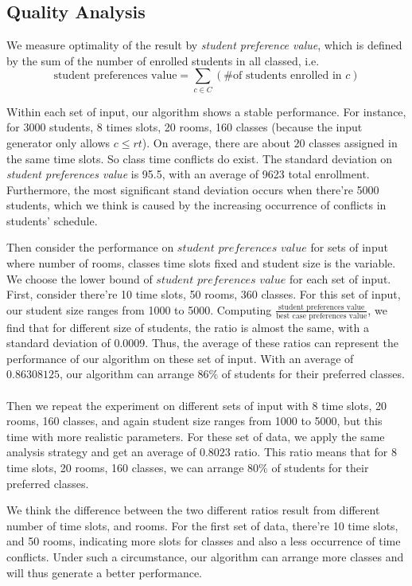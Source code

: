 \documentclass[11pt, oneside]{article}   	%
\begin{document}
 \subsection{Quality Analysis}
\par We measure optimality of the result by \textit{student preference  value}, which is defined by the sum of the number of enrolled students in all classed, i.e. 
\[\text{student preferences value} = \sum_{c\in C} (\text{\# of students enrolled in }c)\]
\par Within each set of input, our algorithm shows a stable performance. For instance, for 3000 students, 8 times slots, 20 rooms, 160 classes (because the input generator only allows $c\leq rt$). On average, there are about $20$ classes assigned in the same time slots. So class time conflicts do exist. The standard deviation on \textit{student preferences value} is 95.5, with an average of 9623 total enrollment. Furthermore, the most significant stand deviation occurs when there're 5000 students, which we think is caused by the increasing occurrence of conflicts in students' schedule. 
\par Then consider the performance on $student$ $preferences$ $value$ for sets of input where number of rooms, classes time slots fixed and student size is the variable. We choose the lower bound of $student$ $preferences$ $value$ for each set of input. First, consider there're 10 time slots, 50 rooms, 360 classes. For this set of input, our student size ranges from 1000 to 5000. Computing $\frac{\text{student preferences value}}{\text{best case preferences value}}$, we find that for different size of students, the ratio is almost the same, with a standard deviation of 0.0009. Thus, the average of these ratios can represent the performance of our algorithm on these set of input. With an average of $0.86308125$, our algorithm can arrange $86\%$ of students for their preferred classes.\\ \\Then we repeat the experiment on different sets of input with 8 time slots, 20 rooms, 160 classes, and again student size ranges from 1000 to 5000, but this time with more realistic parameters. For these set of data, we apply the same analysis strategy and get an average of $0.8023$ ratio. This ratio means that for 8 time slots, 20 rooms, 160 classes, we can arrange $80\%$ of students for their preferred classes.\par
We think the difference between the two different ratios result from different number of time slots, and rooms. For the first set of data, there're 10 time slots, and 50 rooms, indicating more slots for classes and also a less occurrence of time conflicts. Under such a circumstance, our algorithm can arrange more classes and will thus generate a better performance.
\end{document}
